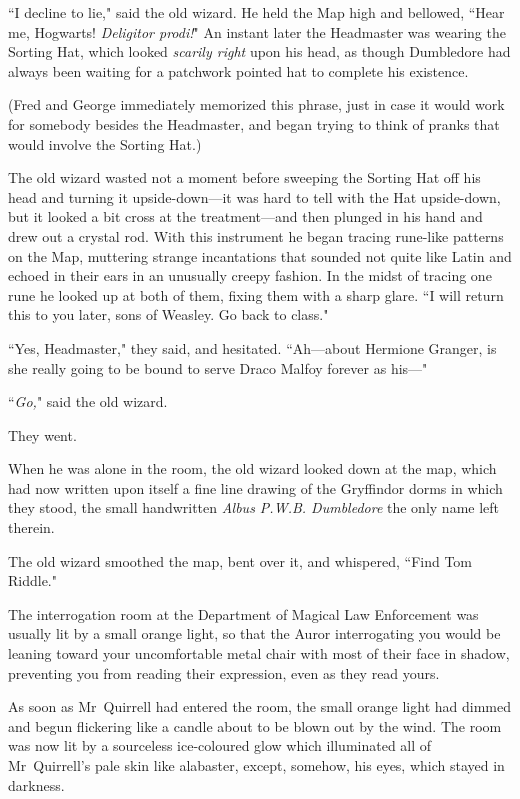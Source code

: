 ``I decline to lie," said the old wizard. He held the Map high and bellowed, ``Hear me, Hogwarts! \emph{Deligitor prodi!}" An instant later the Headmaster was wearing the Sorting Hat, which looked \emph{scarily right} upon his head, as though Dumbledore had always been waiting for a patchwork pointed hat to complete his existence.

(Fred and George immediately memorized this phrase, just in case it would work for somebody besides the Headmaster, and began trying to think of pranks that would involve the Sorting Hat.)

The old wizard wasted not a moment before sweeping the Sorting Hat off his head and turning it upside-down—it was hard to tell with the Hat upside-down, but it looked a bit cross at the treatment—and then plunged in his hand and drew out a crystal rod. With this instrument he began tracing rune-like patterns on the Map, muttering strange incantations that sounded not quite like Latin and echoed in their ears in an unusually creepy fashion. In the midst of tracing one rune he looked up at both of them, fixing them with a sharp glare. ``I will return this to you later, sons of Weasley. Go back to class."

``Yes, Headmaster," they said, and hesitated. ``Ah—about Hermione Granger, is she really going to be bound to serve Draco Malfoy forever as his—"

``\emph{Go,}" said the old wizard.

They went.

When he was alone in the room, the old wizard looked down at the map, which had now written upon itself a fine line drawing of the Gryffindor dorms in which they stood, the small handwritten \emph{Albus P.W.B. Dumbledore} the only name left therein.

The old wizard smoothed the map, bent over it, and whispered, ``Find Tom Riddle."

\later

The interrogation room at the Department of Magical Law Enforcement was usually lit by a small orange light, so that the Auror interrogating you would be leaning toward your uncomfortable metal chair with most of their face in shadow, preventing you from reading their expression, even as they read yours.

As soon as Mr~Quirrell had entered the room, the small orange light had dimmed and begun flickering like a candle about to be blown out by the wind. The room was now lit by a sourceless ice-coloured glow which illuminated all of Mr~Quirrell's pale skin like alabaster, except, somehow, his eyes, which stayed in darkness.

